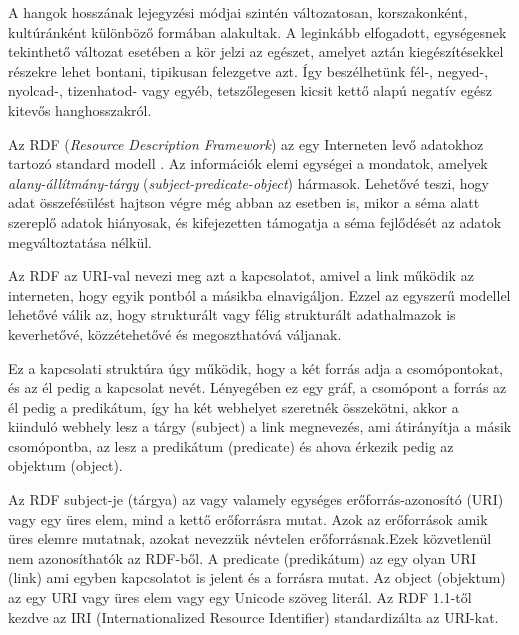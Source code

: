 A hangok hosszának lejegyzési módjai szintén változatosan, korszakonként, kultúránként különböző formában alakultak. A leginkább elfogadott, egységesnek tekinthető változat esetében a kör jelzi az egészet, amelyet aztán kiegészítésekkel részekre lehet bontani, tipikusan felezgetve azt. Így beszélhetünk fél-, negyed-, nyolcad-, tizenhatod- vagy egyéb, tetszőlegesen kicsit kettő alapú negatív egész kitevős hanghosszakról.


Az RDF (\textit{Resource Description Framework}) az egy Interneten levő adatokhoz tartozó standard modell \cite{rdfa_with_example}. Az információk elemi egységei a mondatok, amelyek \textit{alany-állítmány-tárgy} (\textit{subject-predicate-object}) hármasok. Lehetővé teszi, hogy adat összefésülést hajtson végre még abban az esetben is, mikor a séma alatt szereplő adatok hiányosak, és kifejezetten támogatja a séma fejlődését az adatok megváltoztatása nélkül.

Az RDF az URI-val nevezi meg azt a kapcsolatot, amivel a link működik az interneten, hogy egyik pontból a másikba elnavigáljon. Ezzel az egyszerű modellel lehetővé válik az, hogy strukturált vagy félig strukturált adathalmazok is keverhetővé, közzétehetővé és megoszthatóvá váljanak.

Ez a kapcsolati struktúra úgy működik, hogy a két forrás adja a csomópontokat, és az él pedig a kapcsolat nevét. Lényegében ez egy gráf, a csomópont a forrás az él pedig a predikátum, így ha két webhelyet szeretnék összekötni, akkor a kiinduló webhely lesz a tárgy (subject) a link megnevezés, ami átirányítja a másik csomópontba, az lesz a predikátum (predicate) és ahova érkezik pedig az objektum (object).

Az RDF subject-je (tárgya) az vagy valamely egységes erőforrás-azonosító (URI) vagy egy üres elem, mind a kettő erőforrásra mutat. Azok az erőforrások amik üres elemre mutatnak, azokat nevezzük névtelen erőforrásnak.Ezek közvetlenül nem azonosíthatók az RDF-ből. A predicate (predikátum) az egy olyan URI (link) ami egyben kapcsolatot is jelent és a forrásra mutat. Az object (objektum) az egy URI vagy üres elem vagy egy Unicode szöveg literál. Az RDF 1.1-től kezdve az IRI (Internationalized Resource Identifier) standardizálta az URI-kat.

